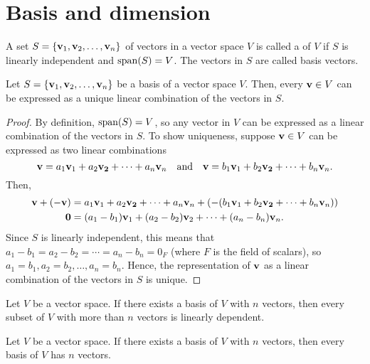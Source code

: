 \section{Basis and dimension}

\begin{defn}
A set $ S=\{\mathbf{v}_1,\mathbf{v}_2,\ldots,\mathbf{v}_n\} $ of vectors in a vector space $ V $ is called a  of $ V $ if $ S $ is linearly independent and $ \operatorname{span}(S)=V $. The vectors in $ S $ are called basis vectors.
\end{defn}

\begin{thm}
Let $ S=\{\mathbf{v}_1,\mathbf{v}_2,\ldots,\mathbf{v}_n\} $ be a basis of a vector space $ V $. Then, every $ \mathbf{v}\in V $ can be expressed as a unique linear combination of the vectors in $ S $.
\end{thm}
\begin{proof}
By definition, $ \operatorname{span}(S)=V $, so any vector in $ V $ can be expressed as a linear combination of the vectors in $ S $. To show uniqueness, suppose $ \mathbf{v}\in V $ can be expressed as two linear combinations
\begin{equation*}
    \mathbf{v}=a_1\mathbf{v}_1+a_2\mathbf{v_2}+\cdots+a_n\mathbf{v}_n \quad\text{and}\quad \mathbf{v}=b_1\mathbf{v}_1+b_2\mathbf{v_2}+\cdots+b_n\mathbf{v}_n.
\end{equation*}
Then,
\begin{align*}
    \mathbf{v}+(-\mathbf{v}) &= a_1\mathbf{v}_1+a_2\mathbf{v_2}+\cdots+a_n\mathbf{v}_n+(-(b_1\mathbf{v}_1+b_2\mathbf{v_2}+\cdots+b_n\mathbf{v}_n)) \\
    \mathbf{0} &= (a_1-b_1)\mathbf{v}_1+(a_2-b_2)\mathbf{v}_2+\cdots+(a_n-b_n)\mathbf{v}_n.
\end{align*}
Since $ S $ is linearly independent, this means that $ a_1-b_1=a_2-b_2=\cdots=a_n-b_n=0_F $ (where $ F $ is the field of scalars), so $ a_1=b_1,a_2=b_2,\ldots,a_n=b_n $. Hence, the representation of $ \mathbf{v} $ as a linear combination of the vectors in $ S $ is unique.
\end{proof}

\begin{thm}
Let $ V $ be a vector space. If there exists a basis of $ V $ with $ n $ vectors, then every subset of $ V $ with more than $ n $ vectors is linearly dependent.
\end{thm}

\begin{cor}
Let $ V $ be a vector space. If there exists a basis of $ V $ with $ n $ vectors, then every basis of $ V $ has $ n $ vectors.
\end{cor}


